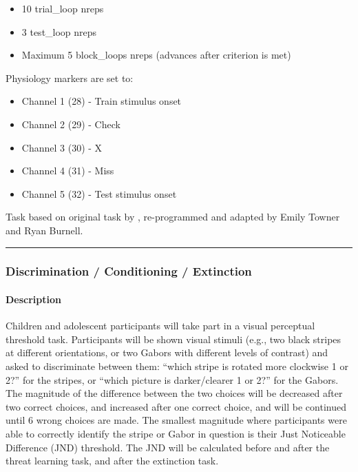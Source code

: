 \documentclass[
]{book}
\providecommand{\tightlist}{%
  \setlength{\itemsep}{0pt}\setlength{\parskip}{0pt}}
\begin{document}
\begin{itemize}
\tightlist
\item
  10 trial\_loop nreps
\item
  3 test\_loop nreps
\item
  Maximum 5 block\_loops nreps (advances after criterion is met)
\end{itemize}

Physiology markers are set to:

\begin{itemize}
\tightlist
\item
  Channel 1 (28) - Train stimulus onset
\item
  Channel 2 (29) - Check
\item
  Channel 3 (30) - X
\item
  Channel 4 (31) - Miss
\item
  Channel 5 (32) - Test stimulus onset
\end{itemize}

Task based on original task by \citet{frank_2004}, re-programmed and adapted by Emily Towner and Ryan Burnell.

\begin{center}\rule{0.5\linewidth}{0.5pt}\end{center}

\hypertarget{discrimination-conditioning-extinction}{%
\subsubsection{Discrimination / Conditioning / Extinction}\label{discrimination-conditioning-extinction}}

\hypertarget{description-4}{%
\paragraph{Description}\label{description-4}}

Children and adolescent participants will take part in a visual perceptual threshold task. Participants will be shown visual stimuli (e.g., two black stripes at different orientations, or two Gabors with different levels of contrast) and asked to discriminate between them: ``which stripe is rotated more clockwise 1 or 2?'' for the stripes, or
``which picture is darker/clearer 1 or 2?'' for the Gabors. The magnitude of the difference between the two choices will be decreased after two correct choices, and increased after one correct choice, and will be continued until 6 wrong choices are made. The smallest magnitude where participants were able to correctly identify the stripe or Gabor in question is their Just Noticeable Difference (JND) threshold. The JND will be calculated before and after the threat learning task, and after the extinction task.
\end{document}
